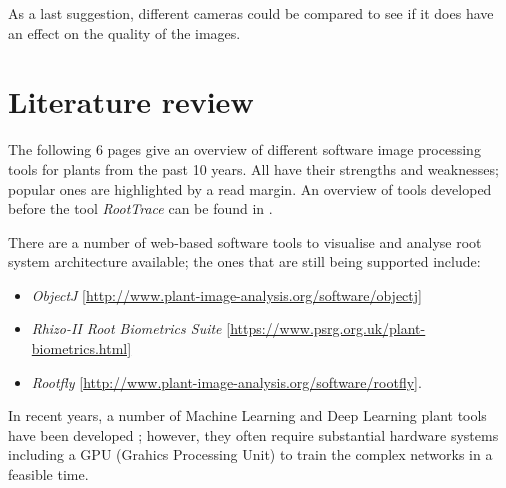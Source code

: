As a last suggestion, different cameras could be compared to see if it does have an effect on the quality of the images. 



\chapter{Literature review}\label{litreview}

The following 6 pages give an overview of different software image processing tools for plants from the past 10 years. All have their strengths and weaknesses; popular ones are highlighted by a read margin. An overview of tools developed before the tool \textit{RootTrace} can be found in \cite{french2009high}.


%



There are a number of web-based software tools to visualise and analyse root system architecture available; the ones that are still being supported include:
\begin{itemize}
	\item \textit{ObjectJ} [\url{http://www.plant-image-analysis.org/software/objectj}]
	\item \textit{Rhizo-II Root Biometrics Suite} \url{[https://www.psrg.org.uk/plant-biometrics.html]}
	\item \textit{Rootfly} [\url{http://www.plant-image-analysis.org/software/rootfly}].
\end{itemize}

In recent years, a number of Machine Learning and Deep Learning plant tools have been developed \cite{pound2017deep,lee2018automated,navarro2016machine}; however, they often require substantial hardware systems including a GPU (Grahics Processing Unit) to train the complex networks in a feasible time.
